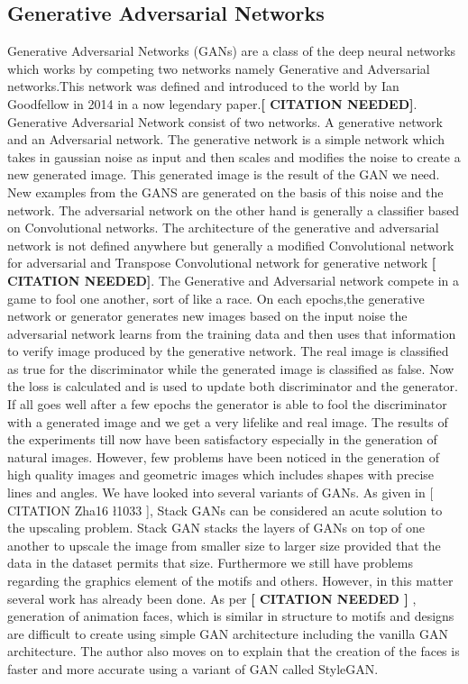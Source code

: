 \documentclass{article}
\begin{document}
\subsection{Generative Adversarial Networks}
Generative Adversarial Networks (GANs) are a class of the deep neural networks which works by competing two networks namely Generative and Adversarial networks.This network was defined and introduced to the world by Ian Goodfellow in 2014 in a now legendary paper.\textbf{[ CITATION NEEDED]}. Generative Adversarial Network consist of two networks. A generative network and an Adversarial network. The generative network is a simple network which takes in gaussian noise as input and then scales and modifies the noise to create a new generated image. This generated image is the result of the GAN we need. New examples from the GANS are generated on the basis of this noise and the network. The adversarial network on the other hand is generally a classifier based on Convolutional networks. The architecture of the generative and adversarial network is not defined anywhere but generally a modified Convolutional network for adversarial and Transpose Convolutional network for generative network \textbf{[ CITATION NEEDED]}. The Generative and Adversarial network compete in a game to fool one another, sort of like a race. On each epochs,the generative network or generator generates new images based on the input noise  the adversarial network learns from the training data and then uses that information to verify image produced by the generative network. The real image is classified as true for the discriminator while the generated image is classified as false. Now the loss is calculated and is used to update both discriminator and the generator. If all goes well after a few epochs the generator is able to fool the discriminator with a generated image and we get a very lifelike and real image.
The results of the experiments till now have been satisfactory especially in the generation of natural images. However, few problems have been noticed in the generation of high quality images and geometric images which includes shapes with precise lines and angles.
We have looked into several variants of GANs. As given in [ CITATION Zha16 \l 1033 ], Stack GANs can be considered an acute solution to the upscaling problem. Stack GAN stacks the layers of GANs on top of one another to upscale the image from smaller size to larger size provided that the data in the dataset permits that size.
Furthermore we still have problems regarding the graphics element of the motifs and others. However, in this matter several work has already been done. As per \textbf{[ CITATION NEEDED ]} , generation of animation faces, which is similar in structure to motifs and designs are difficult to create using simple GAN architecture including the vanilla GAN architecture. The author also moves on to explain that the creation of the faces is faster and more accurate using a variant of GAN called StyleGAN.
\end{document}
